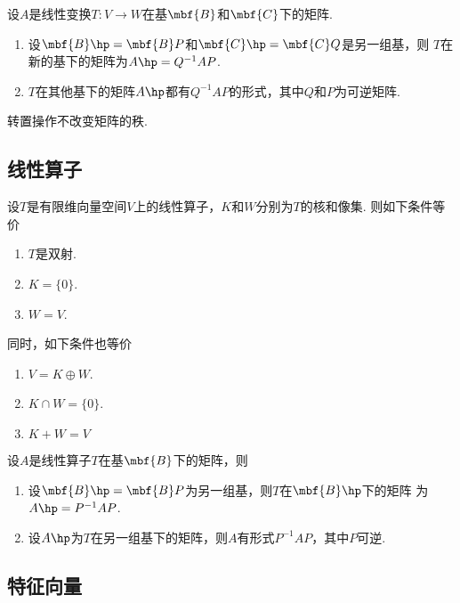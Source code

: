   \begin{thm}
    设$A$是线性变换$T:V\to W$在基$\mbf{B}$和$\mbf{C}$下的矩阵.
    \begin{enumerate}
      \item 设$\mbf{B}\hp=\mbf{B}P$和$\mbf{C}\hp=\mbf{C}Q$是另一组基，则
        $T$在新的基下的矩阵为$A\hp = Q^{-1}AP$.
      \item $T$在其他基下的矩阵$A\hp$都有$Q^{-1}AP$的形式，其中$Q$和$P$为可逆矩阵.
    \end{enumerate}
  \end{thm}

  \begin{thm}
    转置操作不改变矩阵的秩.
  \end{thm}

\subsection{线性算子}

  \begin{thm}
    设$T$是有限维向量空间$V$上的线性算子，$K$和$W$分别为$T$的核和像集. 则如下条件等价
    \begin{enumerate}
      \item $T$是双射.
      \item $K=\{0\}$.
      \item $W=V$.
    \end{enumerate}
    同时，如下条件也等价
    \begin{enumerate}
      \item $V=K\oplus W$.
      \item $K\cap W = \{0\}$.
      \item $K+W=V$
    \end{enumerate}
  \end{thm}

  \begin{thm}
    设$A$是线性算子$T$在基$\mbf{B}$下的矩阵，则
    \begin{enumerate}
      \item 设$\mbf{B}\hp = \mbf{B}P$为另一组基，则$T$在$\mbf{B}\hp$下的矩阵
        为$A\hp=P^{-1}AP$.
      \item 设$A\hp$为$T$在另一组基下的矩阵，则$A$有形式$P^{-1}AP$，其中$P$可逆.
    \end{enumerate}
  \end{thm}

\subsection{特征向量}

